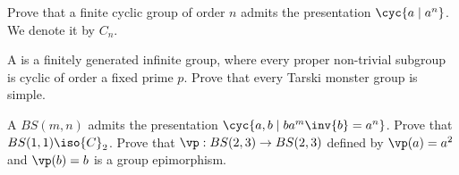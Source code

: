\documentclass[10pt]{article}
\begin{document}
\begin{problem}
    Prove that a finite cyclic group of order $n$ admits the presentation $\cyc{a\mid{a}^{n}}$. We denote it by ${C}_{n}$.
\end{problem}
\begin{problem}
    A  is a finitely generated infinite group, where every proper non-trivial subgroup is cyclic of order a fixed prime $p$. Prove that every Tarski monster group is simple.
\end{problem}
\begin{problem}
    A  $BS(m,n)$ admits the presentation $\cyc{a,b\mid b{a}^{m}\inv{b}={a}^{n}}$. Prove that $BS(1,1)\iso{C}_{2}$. Prove that $\vp:BS(2,3)\to BS(2,3)$ defined by $\vp(a)={a}^{2}$ and $\vp(b)=b$ is a group epimorphism.
\end{problem}
\begin{definition}
    
\end{definition}


\newpage
\end{document}
